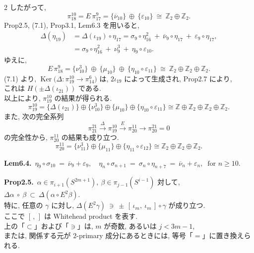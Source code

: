 \documentclass[10pt, leqno]{ltjsarticle}
\newcommand{\ov}[1]{\overline{#1}}
\newcommand{\gen}[1]{\{#1\}}       %
\newcommand{\Ker}{\operatorname{Ker}}
\newcommand{\pit}[2]{\pi_{#1}^{#2}}
\numberwithin{equation}{section}
\theoremstyle{plain}
\theoremstyle{definition}
\theoremstyle{remark}
\begin{document}
\begin{paracol}{2}
\noindent
したがって,
\[
\pit{18}{10}=E\,\pit{17}{9}
=\gen{\ov{\nu}_{10}}\ \oplus\ \gen{\varepsilon_{10}}
\ \cong\ \mathbb Z_{2}\oplus\mathbb Z_{2}.
\]
Prop2.5, (7.1),  Prop3.1,  Lem6.3 を用いると,
\[
\begin{align*}
\Delta(\eta_{19})
& = \Delta(\iota_{19})\circ\eta_{17}
=\sigma_{9}\circ\eta_{16}^{2}\ +\ \ov{\nu}_{9}\circ\eta_{17}\ 
+\ \varepsilon_{9}\circ\eta_{17},\\
& = \sigma_{9}\circ\eta_{16}^{2}\ +\ \nu_{9}^3\ 
+\ \eta_{9}\circ\varepsilon_{10}.
\end{align*}
\]
ゆえに,
\[
E\,\pit{18}{9}
=\gen{\nu_{10}^3}\ \oplus\ \gen{\mu_{10}}\ \oplus\ \gen{\eta_{10}\circ\varepsilon_{11}}
\ \cong\ \mathbb Z_{2}\oplus\mathbb Z_{2}\oplus\mathbb Z_{2}.
\]
(7.1) より, 
\(\Ker\bigl(\Delta:\pit{19}{10}\to\pit{14}{6}\bigr)\) は,
\(2\iota_{19}\) によって生成され,  
Prop2.7 により, \\
これは 
\(H(\pm\Delta(\iota_{21}))\) である. \\
以上により, \(\pit{19}{10}\) の結果が得られる. 
\[
\pit{19}{10}=
\gen{\Delta(\iota_{21})}\oplus\gen{\nu_{10}^{3}}\oplus
\gen{\mu_{10}}\oplus\gen{\eta_{10}\circ\varepsilon_{11}}
\cong\mathbb Z\oplus\mathbb Z_{2}\oplus\mathbb Z_{2}\oplus\mathbb Z_{2}.
\]
また, 次の完全系列
\[
\pit{21}{21}\xrightarrow{\ \Delta\ }\pit{19}{10}
\xrightarrow{\ E\ }\pit{20}{11}\longrightarrow \pit{20}{21} = 0
\]
の完全性から, \(\pit{20}{11}\) の結果も成り立つ. 
\[
\pit{20}{11}=\gen{\nu_{11}^{3}}\oplus\gen{\mu_{11}}\oplus
\gen{\eta_{11}\circ\varepsilon_{12}}
\cong\mathbb Z_{2}\oplus\mathbb Z_{2}\oplus\mathbb Z_{2} .
\]

\switchcolumn

\noindent
\textbf{Lem6.4.}\
\(
\eta_9\circ \sigma_{10}\ =\ \overline\nu_9+\varepsilon_9,
\quad \eta_n\circ \sigma_{n+1}\ =\ 
\sigma_n \circ\eta_{n+7}\ =\
\overline\nu_n+\varepsilon_n,\ \text{ for } n\ge10.
\)

\noindent
\textbf{Prop2.5.}\
$\alpha\in\pi_{i+1}(S^{2m+1}), \ \beta\in \pi_{j-1}(S^{i-1})$ 対して, 
\(
\Delta\alpha\ \circ\ \beta\ \subset\ \Delta(\alpha\circ E^2\beta).
\)\\
特に, 任意の $\gamma$ に対し,
\(
\Delta(E^2\gamma)\ \ni\ \pm\,[\,\iota_m,\ \iota_m\,]\circ\gamma
\)
が成り立つ. \\
ここで $[\, ,\,]$ は Whitehead product を表す. \\
上の「$\subset$」および「$\ni$」は, $m$ が奇数, 
あるいは $j<3m-1$, \\
または, 関係する元が \(2\)-primary 成分にあるときには, 
等号「$=$」に置き換えられる. 


\end{paracol}
\end{document}
